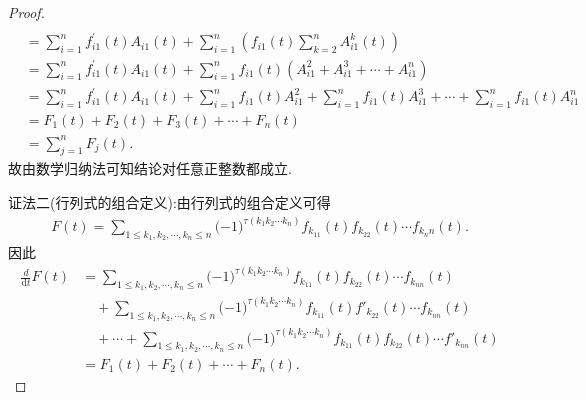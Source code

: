 \documentclass[../../main.tex]{subfiles}
\begin{document}
\begin{proof}
\begin{align*}
\\
&=\sum_{i=1}^n{f_{i1}^{\prime}\left( t \right) A_{i1}\left( t \right)}+\sum_{i=1}^n{\left( f_{i1}\left( t \right) \sum_{k=2}^n{A_{i1}^{k}\left( t \right)} \right)}
\\
&=\sum_{i=1}^n{f_{i1}^{\prime}\left( t \right) A_{i1}\left( t \right)}+\sum_{i=1}^n{f_{i1}\left( t \right) \left( A_{i1}^{2}+A_{i1}^{3}+\cdots +A_{i1}^{n} \right)}
\\
&=\sum_{i=1}^n{f_{i1}^{\prime}\left( t \right) A_{i1}\left( t \right)}+\sum_{i=1}^n{f_{i1}\left( t \right) A_{i1}^{2}}+\sum_{i=1}^n{f_{i1}\left( t \right) A_{i1}^{3}}+\cdots +\sum_{i=1}^n{f_{i1}\left( t \right) A_{i1}^{n}}
\\
&=F_1\left( t \right) +F_2\left( t \right) +F_3\left( t \right) +\cdots +F_n\left( t \right) 
\\
&=\sum_{j=1}^n{F_j\left( t \right)}.
\end{align*}
故由数学归纳法可知结论对任意正整数都成立.

{\color{blue}证法二(行列式的组合定义):}由行列式的组合定义可得
\begin{align*}
F(t)=\sum_{1\le k_1,k_2,\cdots ,k_n\le n}{(}-1)^{\tau (k_1k_2\cdots k_n)}f_{k_11}(t)f_{k_22}(t)\cdots f_{k_nn}(t).
\end{align*}
因此
\begin{align*}
\frac{d}{\mathrm{d}t}F(t)&=\sum_{1\le k_1,k_2,\cdots ,k_n\le n}{(}-1)^{\tau (k_1k_2\cdots k_n)}f_{k_{11}}(t)f_{k_{22}}(t)\cdots f_{k_{nn}}(t)
\\
&\quad+\sum_{1\le k_1,k_2,\cdots ,k_n\le n}{(}-1)^{\tau (k_1k_2\cdots k_n)}f_{k_{11}}(t)f\prime_{k_{22}}(t)\cdots f_{k_{nn}}(t)
\\
&\quad+\cdots +\sum_{1\le k_1,k_2,\cdots ,k_n\le n}{(}-1)^{\tau (k_1k_2\cdots k_n)}f_{k_{11}}(t)f_{k_{22}}(t)\cdots f\prime_{k_{nn}}(t)
\\
&=F_1(t)+F_2(t)+\cdots +F_n(t).
\end{align*}
\end{proof}
\end{document}
